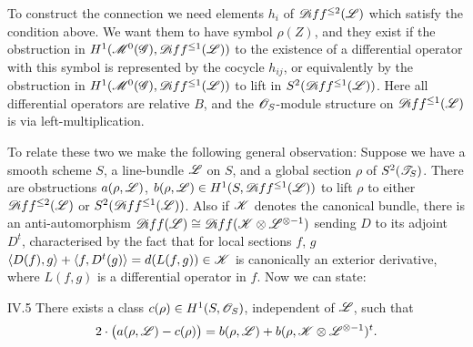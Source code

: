 \documentclass[12pt,english]{smfart}
\theoremstyle{plain} \newtheorem{innerthm}{Theorem} \newtheorem{innerlem}{Lemma} \newtheorem{innerprop}{Proposition} \newtheorem{innercor}{Corollary} \theoremstyle{definition} \newtheorem{innerdefn}{Definition} \newtheorem{innerconstr}{Construction} \theoremstyle{remark} \newtheorem*{remark}{Remark} \newtheorem*{remarks}{Remarks} \newtheorem*{applications}{Applications}
\begin{document}
To construct the connection we need elements $h_i$ of $\mathscr{D}\!iff^{\le 2}(\mathscr{L})$ which satisfy the condition above. We want them to have symbol $\rho(Z)$, and they exist if the obstruction in $H^1(\mathscr{M}^0(\mathscr{G}),\mathscr{D}\!iff^{\le 1}(\mathscr{L}))$ to the existence of a differential operator with this symbol is represented by the cocycle $h_{ij}$, or equivalently by the obstruction in $H^1(\mathscr{M}^0(\mathscr{G}),\mathscr{D}\!iff^{\le 1}(\mathscr{L}))$ to lift in $S^2(\mathscr{D}\!iff^{\le 1}(\mathscr{L}))$. Here all differential operators are relative $B$, and the $\mathscr{O}_S$-module structure on $\mathscr{D}\!iff^{\le 1}(\mathscr{L})$ is via left-multiplication.

To relate these two we make the following general observation: Suppose we have a smooth scheme $S$, a line-bundle $\mathscr{L}$ on $S$, and a global section $\rho$ of $S^2(\mathscr{T}_S)$. There are obstructions $a(\rho,\mathscr{L})$, $b(\rho,\mathscr{L})\in H^1(S,\mathscr{D}\!iff^{\le 1}(\mathscr{L}))$ to lift $\rho$ to either $\mathscr{D}\!iff^{\le 2}(\mathscr{L})$ or $S^2(\mathscr{D}\!iff^{\le 1}(\mathscr{L}))$. Also if $\mathscr{K}$ denotes the canonical bundle, there is an anti-automorphism $\mathscr{D}\!iff(\mathscr{L})\cong\mathscr{D}\!iff(\mathscr{K}\otimes\mathscr{L}^{\otimes-1})$ sending $D$ to its adjoint $D^t$, characterised by the fact that for local sections $f$, $g$ $\langle D(f),g\rangle+\langle f,D^t(g)\rangle=d(L(f,g)) \in\mathscr{K}$ is canonically an exterior derivative, where $L(f,g)$ is a differential operator in $f$. Now we can state:

\begin{proposition}{IV.5}\label{prop:IV.5}
There exists a class $c(\rho)\in H^1(S,\mathscr{O}_S)$, independent of $\mathscr{L}$, such that
\[
2\cdot\bigl(a(\rho,\mathscr{L})-c(\rho)\bigr)
= b(\rho,\mathscr{L})+b(\rho,\mathscr{K}\otimes\mathscr{L}^{\otimes-1})^t .
\]
\end{proposition}
\end{document}
